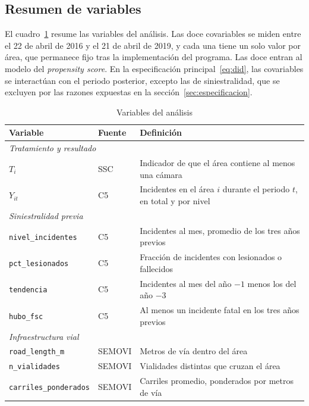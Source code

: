 \subsection{Resumen de variables}

\noindent El cuadro~\ref{tab:variables} resume las variables del análisis. Las doce covariables se miden entre el 22 de abril de 2016 y el 21 de abril de 2019, y cada una tiene un solo valor por área, que permanece fijo tras la implementación del programa. Las doce entran al modelo del \emph{propensity score}. En la especificación principal~\eqref{eq:did}, las covariables se interactúan con el periodo posterior, excepto las de siniestralidad, que se excluyen por las razones expuestas en la sección~\ref{sec:especificacion}.

\begin{table}[htbp]
    \centering
    \caption{Variables del análisis}
    \label{tab:variables}
    \footnotesize
    \begin{tabularx}{\textwidth}{l l >{\raggedright\arraybackslash}X}
        \toprule
        Variable & Fuente & Definición \\
        \midrule
        \multicolumn{3}{l}{\textit{Tratamiento y resultado}} \\
        $T_i$ & SSC & Indicador de que el área contiene al menos una cámara \\
        $Y_{it}$ & C5 & Incidentes en el área $i$ durante el periodo $t$, en total y por nivel \\
        \midrule
        \multicolumn{3}{l}{\textit{Siniestralidad previa}} \\
        \texttt{nivel\_incidentes} & C5 & Incidentes al mes, promedio de los tres años previos \\
        \texttt{pct\_lesionados} & C5 & Fracción de incidentes con lesionados o fallecidos \\
        \texttt{tendencia} & C5 & Incidentes al mes del año $-1$ menos los del año $-3$ \\
        \texttt{hubo\_fsc} & C5 & Al menos un incidente fatal en los tres años previos \\
        \midrule
        \multicolumn{3}{l}{\textit{Infraestructura vial}} \\
        \texttt{road\_length\_m} & SEMOVI & Metros de vía dentro del área \\
        \texttt{n\_vialidades} & SEMOVI & Vialidades distintas que cruzan el área \\
        \texttt{carriles\_ponderados} & SEMOVI & Carriles promedio, ponderados por metros de vía \\

\end{tabularx}
\end{table}
